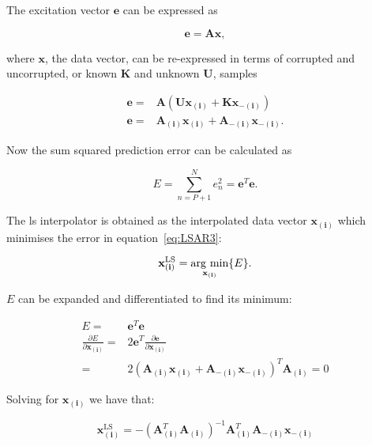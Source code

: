 The excitation vector $\mathbf{e}$ can be expressed as

\begin{equation}\label{eq:LSAR1}
  \mathbf{e} = \mathbf{A}\mathbf{x},
\end{equation}

where $\mathbf{x}$, the data vector, can be re-expressed in terms of corrupted and uncorrupted, or known $\mathbf{K}$ and unknown $\mathbf{U}$, samples

\begin{align}\label{eq:LSAR2}
  \mathbf{e} = & \mathbf{A} (\mathbf{U}\mathbf{x}_{\mathbf{(i)}} + \mathbf{K}\mathbf{x}_{\mathbf{-(i)}}) \\
  \mathbf{e} = & \mathbf{A}_{\mathbf{(i)}} \mathbf{x}_{\mathbf{(i)}} + \mathbf{A}_{\mathbf{-(i)}}\mathbf{x}_{\mathbf{-(i)}}.
\end{align}

Now the sum squared prediction error can be calculated as

\begin{equation}\label{eq:LSAR3}
  E = \sum^N_{n=P+1} e^2_n = \mathbf{e}^T\mathbf{e}.
\end{equation}

The \gls{ls} interpolator is obtained as the interpolated data vector $\mathbf{x}_{\mathbf{(i)}}$ which minimises the error in equation~\ref{eq:LSAR3}:

\begin{equation}\label{eq:LSAR4}
  \mathbf{x}^{\mathrm{LS}}_{\mathbf{(i)}} = \underset{\mathbf{x}_{\mathbf{(i)}}}{\mathrm{arg~min}} \{ E \}.
\end{equation}

$E$ can be expanded and differentiated to find its minimum:

\begin{align}\label{eq:LSAR5}
  E = & \mathbf{e}^T\mathbf{e} \\
  \frac{\partial E}{\partial \mathbf{x}_{\mathbf{(i)}}} = & 2\mathbf{e}^T \frac{\partial \mathbf{e}}{\partial \mathbf{x}_{\mathbf{(i)}}} \\
   = & 2 (\mathbf{A}_{\mathbf{(i)}} \mathbf{x}_{\mathbf{(i)}} + \mathbf{A}_{\mathbf{-(i)}}\mathbf{x}_{\mathbf{-(i)}})^T \mathbf{A}_{\mathbf{(i)}} = 0
\end{align}

Solving for $\mathbf{x}_{\mathbf{(i)}}$ we have that:

\begin{equation}\label{eq:LSAR6}
  \mathbf{x}^{\mathrm{LS}}_{\mathbf{(i)}} = - (\mathbf{A}_{\mathbf{(i)}}^T \mathbf{A}_{\mathbf{(i)}} )^{-1}\mathbf{A}_{\mathbf{(i)}}^T\mathbf{A}_{\mathbf{-(i)}}\mathbf{x}_{\mathbf{-(i)}}
\end{equation}

